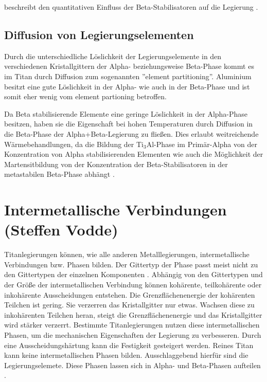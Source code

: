 \documentclass[a4paper, 11pt]{tubsreprt}
\begin{document}
beschreibt den quantitativen Einfluss der Beta-Stabilisatoren auf die Legierung \cite{Luetjering2007}.

\subsection{Diffusion von Legierungselementen}\label{Kapitel Diffusion von legierungselementen}
Durch die unterschiedliche Löslichkeit der Legierungselemente in den verschiedenen Kristallgittern der Alpha- beziehungsweise Beta-Phase kommt es im Titan durch Diffusion zum sogenannten ''element partitioning''. Aluminium besitzt eine gute Löslichkeit in der Alpha- wie auch in der Beta-Phase und ist somit eher wenig vom element partioning betroffen.

Da Beta stabilisierende Elemente eine geringe Löslichkeit in der Alpha-Phase besitzen, haben sie die Eigenschaft bei hohen Temperaturen durch Diffusion in die Beta-Phase der Alpha+Beta-Legierung zu fließen. Dies erlaubt weitreichende Wärmebehandlungen, da die Bildung der Ti$_{3}$Al-Phase im Primär-Alpha von der Konzentration von Alpha stabilisierenden Elementen wie auch die Möglichkeit der Martensitbildung von der Konzentration der Beta-Stabilisatoren in der metastabilen Beta-Phase abhängt \cite{Luetjering2007}.
\newpage

\section{Intermetallische Verbindungen (Steffen Vodde)}
Titanlegierungen können, wie alle anderen Metalllegierungen, intermetallische Verbindungen bzw. Phasen bilden. Der Gittertyp der Phase passt meist nicht zu den Gittertypen der einzelnen Komponenten \cite{Domke1986}. Abhängig von den Gittertypen und der Größe der intermetallischen Verbindung können kohärente, teilkohärente oder inkohärente Ausscheidungen entstehen. Die Grenzflächenenergie der kohärenten Teilchen ist gering. Sie verzerren das Kristallgitter nur etwas. Wachsen diese zu inkohärenten Teilchen heran, steigt die Grenzflächenenergie und das Kristallgitter wird stärker verzerrt. 
Bestimmte Titanlegierungen nutzen diese intermetallischen Phasen, um die mechanischen Eigenschaften der Legierung zu verbesseren. Durch eine Ausscheidungshärtung kann die Festigkeit gesteigert werden. Reines Titan kann keine intermetallischen Phasen bilden. Ausschlaggebend hierfür sind die Legierungselemete. Diese Phasen lassen sich in Alpha- und Beta-Phasen aufteilen \cite{Luetjering2007}.  
 
\end{document}

